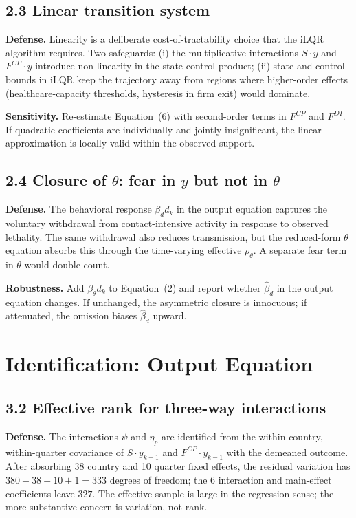 \documentclass[11pt,a4paper]{article}
\begin{document}
\subsection*{2.3 Linear transition system}

\textbf{Defense.} Linearity is a deliberate cost-of-tractability choice that the iLQR algorithm requires. Two safeguards: (i) the multiplicative interactions $S \cdot y$ and $F^{CP} \cdot y$ introduce non-linearity in the state-control product; (ii) state and control bounds in iLQR keep the trajectory away from regions where higher-order effects (healthcare-capacity thresholds, hysteresis in firm exit) would dominate.

\textbf{Sensitivity.} Re-estimate Equation~(6) with second-order terms in $F^{CP}$ and $F^{DI}$. If quadratic coefficients are individually and jointly insignificant, the linear approximation is locally valid within the observed support.

\subsection*{2.4 Closure of $\theta$: fear in $y$ but not in $\theta$}

\textbf{Defense.} The behavioral response $\beta_d d_k$ in the output equation captures the voluntary withdrawal from contact-intensive activity in response to observed lethality. The same withdrawal also reduces transmission, but the reduced-form $\theta$ equation absorbs this through the time-varying effective $\rho_\theta$. A separate fear term in $\theta$ would double-count.

\textbf{Robustness.} Add $\beta_\theta d_k$ to Equation~(2) and report whether $\hat\beta_d$ in the output equation changes. If unchanged, the asymmetric closure is innocuous; if attenuated, the omission biases $\hat\beta_d$ upward.

\section{Identification: Output Equation}

\subsection*{3.2 Effective rank for three-way interactions}

\textbf{Defense.} The interactions $\psi$ and $\eta_p$ are identified from the within-country, within-quarter covariance of $S \cdot y_{k-1}$ and $F^{CP} \cdot y_{k-1}$ with the demeaned outcome. After absorbing 38 country and 10 quarter fixed effects, the residual variation has $380 - 38 - 10 + 1 = 333$ degrees of freedom; the 6 interaction and main-effect coefficients leave $327$. The effective sample is large in the regression sense; the more substantive concern is variation, not rank.
\end{document}
